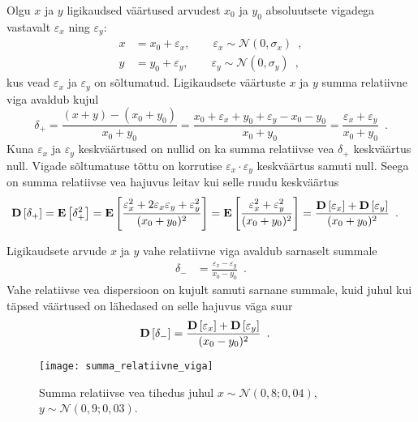 Olgu $x$ ja $y$ ligikaudsed väärtused arvudest $x_0$ ja $y_0$ absoluutsete vigadega vastavalt $\varepsilon_x$ ning $\varepsilon_y$:
\begin{align*}
    x &= x_0 + \varepsilon_x ,\qquad \varepsilon_x \sim \mathcal{N}(0, \sigma_x) \enspace,\\
    y &= y_0 + \varepsilon_y ,\qquad \varepsilon_y \sim \mathcal{N}(0, \sigma_y) \enspace,
\end{align*}
kus vead $\varepsilon_x$ ja $\varepsilon_y$ on sõltumatud. Ligikaudsete väärtuste $x$ ja $y$ summa relatiivne viga avaldub kujul
\begin{equation*}
    \delta_{+}=\frac{(x+y)-(x_0+y_0)}{x_0+y_0}=\frac{x_0+\varepsilon_x+y_0+\varepsilon_y-x_0-y_0}{x_0+y_0}=\frac{\varepsilon_x+\varepsilon_y}{x_0+y_0} \enspace.
\end{equation*}
Kuna $\varepsilon_x$ ja $\varepsilon_y$ keskväärtused on nullid on ka summa relatiivse vea $\delta_{+}$ keskväärtus null. Vigade sõltumatuse tõttu on korrutise $\varepsilon_x \cdot \varepsilon_y$ keskväärtus samuti null. Seega on summa relatiivse vea hajuvus leitav kui selle ruudu keskväärtus
\begin{align*}
    \operatorname*{\mathbf{D}}\left[\delta_{+}\right] &= \operatorname*{\mathbf{E}}\left[\delta_{+}^2\right] = \operatorname*{\mathbf{E}}\left[\frac{\varepsilon_x^2 + 2\varepsilon_x \varepsilon_y + \varepsilon_y^2}{(x_0 + y_0)^2}\right] = \operatorname*{\mathbf{E}}\left[\frac{\varepsilon_x^2 + \varepsilon_y^2}{(x_0 + y_0)^2}\right]=\frac{\operatorname*{\mathbf{D}}\left[\varepsilon_x\right] + \operatorname*{\mathbf{D}}\left[\varepsilon_y\right]}{(x_0 + y_0)^2} \enspace.
\end{align*}

Ligikaudsete arvude $x$ ja $y$ vahe relatiivne viga avaldub sarnaselt summale
\begin{align*}
    \delta_{-} &= \frac{\varepsilon_x - \varepsilon_y}{x_0 - y_0} \enspace.
\end{align*}
Vahe relatiivse vea dispersioon on kujult samuti sarnane summale, kuid juhul kui täpsed väärtused on lähedased on selle hajuvus väga suur
\begin{align*}
    \operatorname*{\mathbf{D}}\left[\delta_{-}\right] &= \frac{\operatorname*{\mathbf{D}}\left[\varepsilon_x\right] + \operatorname*{\mathbf{D}}\left[\varepsilon_y\right]}{(x_0 - y_0)^2} \enspace.
\end{align*}

\begin{figure}[H]
    \begin{center}
        \texttt{[image: summa\_relatiivne\_viga]}
    \end{center}
    \caption{Summa relatiivse vea tihedus juhul $x \sim \mathcal{N}(0{,}8; 0{,}04)$, $y \sim \mathcal{N}(0{,}9; 0{,}03)$.}
    \label{fig:summa relatiivne viga tihedus}
\end{figure}

